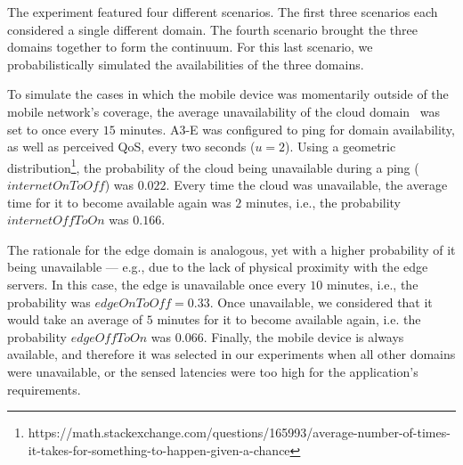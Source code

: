 The experiment featured four different scenarios. The first three scenarios each considered a single different domain. The fourth scenario brought the three domains together to form the continuum. For this last scenario, we probabilistically simulated the availabilities of the three domains. 

To simulate the cases in which the mobile device was momentarily outside of the mobile network's coverage, the average unavailability of the cloud domain~\cite{garcia2017bandwidth} was set to once every $15$ minutes. A3-E was configured to ping for domain availability, as well as perceived QoS, every two seconds ($u = 2$). Using a geometric distribution\footnote{https://math.stackexchange.com/questions/165993/average-number-of-times-it-takes-for-something-to-happen-given-a-chance}, the probability of the cloud being unavailable during a ping ($internetOnToOff$) was $0.022$. Every time the cloud was unavailable, the average time for it to become available again was $2$ minutes, i.e., the probability  $internetOffToOn$ was $0.166$. 


The rationale for the edge domain is analogous, yet with a higher probability of it being unavailable --- e.g., due to the lack of physical proximity with the edge servers. In this case, the edge is unavailable once every $10$ minutes, i.e., the probability was $edgeOnToOff = 0.33$. Once unavailable, we considered that it would take an average of $5$ minutes for it to become available again, i.e. the probability $edgeOffToOn$ was $0.066$. Finally, the mobile device is always available, and therefore it was selected in our experiments when all other domains were unavailable, or the sensed latencies were too high for the application's requirements.

